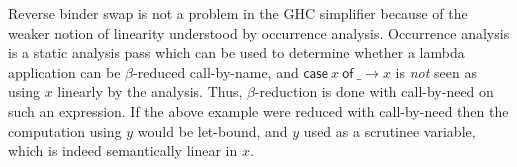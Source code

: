 \documentclass[acmsmall,review,anonymous]{acmart}
\newcommand{\llet}[2]{\mathsf{let}~#1~\mathsf{in}~#2}
\newcommand{\ccase}[2]{\mathsf{case}~#1~\mathsf{of}~#2}
\begin{document}
Reverse binder swap is not a problem in the GHC simplifier because of the
weaker notion of linearity understood by occurrence analysis. Occurrence
analysis is a static analysis pass which can be used to determine whether a
lambda application can be $\beta$-reduced call-by-name, and $\ccase{x}{\_ \to
x}$ is \emph{not} seen as using $x$ linearly by the analysis. Thus,
$\beta$-reduction is done with call-by-need on such an expression. If the above
example were reduced with call-by-need
then the computation using $y$ would be let-bound, and $y$ used as a scrutinee
variable, which is indeed semantically linear in $x$.


% 

\end{document}
